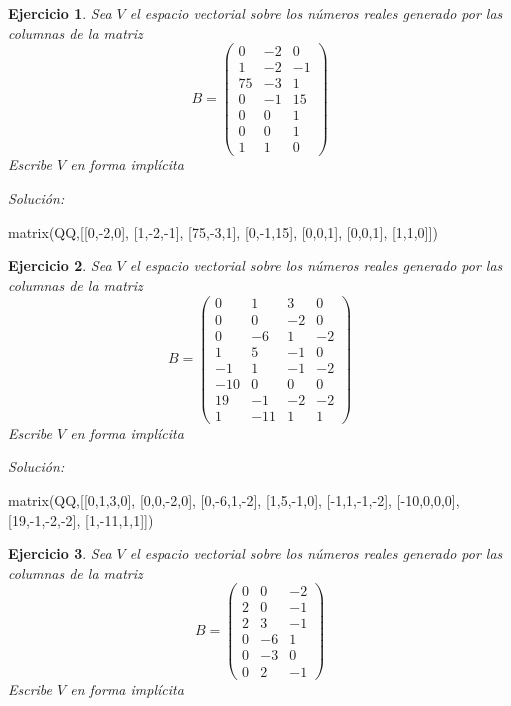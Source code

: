 \documentclass{amsart}
\newtheorem{ejer}{Ejercicio}
\begin{document}
\begin{ejer} Sea $V$ el espacio vectorial sobre los números reales 
generado por las columnas de la matriz 
\[B = \left(\begin{array}{rrr}
0 & -2 & 0 \\
1 & -2 & -1 \\
75 & -3 & 1 \\
0 & -1 & 15 \\
0 & 0 & 1 \\
0 & 0 & 1 \\
1 & 1 & 0
\end{array}\right)\]
Escribe $V$ en forma impl\'icita 
\end{ejer}

{\it Soluci\'on:}

\begin{sageblock}
matrix(QQ,[[0,-2,0],
[1,-2,-1],
[75,-3,1],
[0,-1,15],
[0,0,1],
[0,0,1],
[1,1,0]])
\end{sageblock}



\begin{ejer} Sea $V$ el espacio vectorial sobre los números reales 
generado por las columnas de la matriz 
\[B = \left(\begin{array}{rrrr}
0 & 1 & 3 & 0 \\
0 & 0 & -2 & 0 \\
0 & -6 & 1 & -2 \\
1 & 5 & -1 & 0 \\
-1 & 1 & -1 & -2 \\
-10 & 0 & 0 & 0 \\
19 & -1 & -2 & -2 \\
1 & -11 & 1 & 1
\end{array}\right)\]
Escribe $V$ en forma impl\'icita 
\end{ejer}

{\it Soluci\'on:}

\begin{sageblock}
matrix(QQ,[[0,1,3,0],
[0,0,-2,0],
[0,-6,1,-2],
[1,5,-1,0],
[-1,1,-1,-2],
[-10,0,0,0],
[19,-1,-2,-2],
[1,-11,1,1]])
\end{sageblock}



\begin{ejer} Sea $V$ el espacio vectorial sobre los números reales 
generado por las columnas de la matriz 
\[B = \left(\begin{array}{rrr}
0 & 0 & -2 \\
2 & 0 & -1 \\
2 & 3 & -1 \\
0 & -6 & 1 \\
0 & -3 & 0 \\
0 & 2 & -1
\end{array}\right)\]
Escribe $V$ en forma impl\'icita 
\end{ejer}
\end{document}
